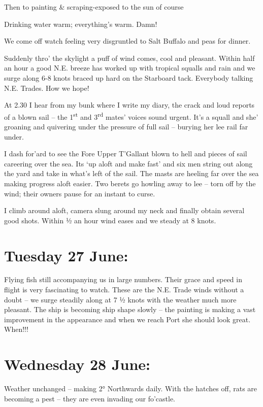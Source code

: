 \documentclass[
  11pt,
  msmallroyalvopaper
]{memoir}
\begin{document}
Then to painting \& scraping-exposed to the sun of course

Drinking water warm; everything's warm. Damn!

We come off watch feeling very disgruntled to Salt Buffalo and peas for
dinner.

Suddenly thro' the skylight a puff of wind comes, cool and pleasant.
Within half an hour a good N.E. breeze has worked up with tropical
squalls and rain and we surge along 6-8 knots braced up hard on the
Starboard tack. Everybody talking N.E. Trades. How we hope!

At 2.30 I hear from my bunk where I write my diary, the crack and loud
reports of a blown sail -- the 1\textsuperscript{st} and
3\textsuperscript{rd} mates' voices sound urgent. It's a squall and she'
groaning and quivering under the pressure of full sail -- burying her
lee rail far under.

I dash for'ard to see the Fore Upper T'Gallant blown to hell and pieces
of sail careering over the sea. Its `up aloft and make fast' and six men
string out along the yard and take in what's left of the sail. The masts
are heeling far over the sea making progress aloft easier. Two berets go
howling away to lee -- torn off by the wind; their owners pause for an
instant to curse.

I climb around aloft, camera slung around my neck and finally obtain
several good shots. Within ½ an hour wind eases and we steady at 8
knots.

\hypertarget{tuesday-27-june}{%
\section{Tuesday 27 June:}\label{tuesday-27-june}}

Flying fish still accompanying us in large numbers. Their grace and
speed in flight is very fascinating to watch. These are the N.E. Trade
winds without a doubt -- we surge steadily along at 7 ½ knots with the
weather much more pleasant. The ship is becoming ship shape slowly --
the painting is making a vast improvement in the appearance and when we
reach Port she should look great. When!!!

\hypertarget{wednesday-28-june}{%
\section{Wednesday 28 June:}\label{wednesday-28-june}}

Weather unchanged -- making 2° Northwards daily. With the hatches off,
rats are becoming a pest -- they are even invading our fo'castle.
\end{document}
